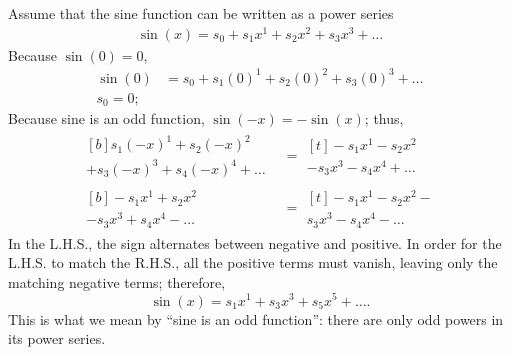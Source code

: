 Assume that the sine function can be written as a power series
\begin{align}
	\sin(x) = s_0 + s_1x^1 + s_2x^2 + s_3x^3 + \dots
\end{align}
Because $\sin(0) = 0$,
\begin{align}
	\sin(0) &= s_0 + s_1(0)^1 + s_2(0)^2 + s_3(0)^3 + \dots \\
	s_0 = 0;
\end{align}
Because sine is an odd function, $\sin(-x) = -\sin(x)$; thus,
\begin{align}
	\begin{multlined}[b]
		s_1(-x)^1 + s_2(-x)^2 \\
		+ s_3(-x)^3 + s_4(-x)^4 + \dots
	\end{multlined} &=
	\begin{multlined}[t]
		-s_1x^1 - s_2x^2 \\
		- s_3x^3 - s_4x^4 + \dots 
	\end{multlined} \\
	\begin{multlined}[b]
		-s_1x^1 + s_2x^2 \\
		- s_3x^3 + s_4x^4 - \dots
	\end{multlined} &=
	\begin{multlined}[t]
		-s_1x^1 - s_2x^2 - \\
		s_3x^3 - s_4x^4 - \dots
	\end{multlined}
\end{align}
In the L.H.S., the sign alternates between negative and positive. In order for the L.H.S. to match the R.H.S., all the positive terms must vanish, leaving only the matching negative terms; therefore,
\begin{equation}
	\sin(x) = s_1x^1 + s_3x^3 + s_5x^5 + \dots.
\end{equation}
This is what we mean by \enquote{sine is an odd function}: there are only odd powers in its power series.

